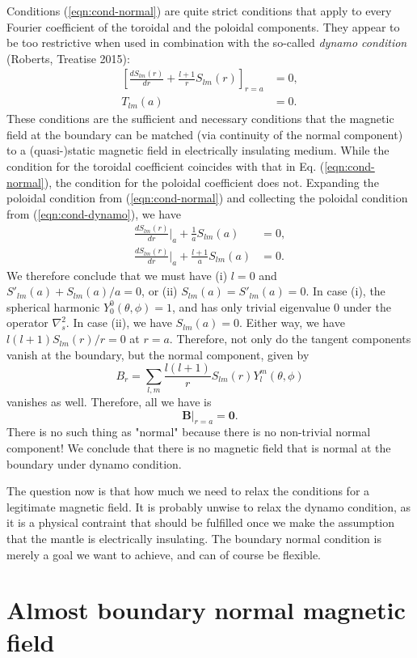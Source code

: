 \documentclass[a4paper, 11pt]{article}
\begin{document}
Conditions (\ref{eqn:cond-normal}) are quite strict conditions that apply to every Fourier coefficient of the toroidal and the poloidal components. They appear to be too restrictive when used in combination with the so-called \textit{dynamo condition} (Roberts, Treatise 2015):
\begin{equation}\label{eqn:cond-dynamo}
\begin{aligned}
    \left[\frac{dS_{lm}(r)}{dr} + \frac{l+1}{r} S_{lm}(r)\right]_{r=a} &= 0,\\
    T_{lm}(a) &= 0.
\end{aligned}
\end{equation}
These conditions are the sufficient and necessary conditions that the magnetic field at the boundary can be matched (via continuity of the normal component) to a (quasi-)static magnetic field in electrically insulating medium.
While the condition for the toroidal coefficient coincides with that in Eq. (\ref{eqn:cond-normal}), the condition for the poloidal coefficient does not. Expanding the poloidal condition from (\ref{eqn:cond-normal}) and collecting the poloidal condition from (\ref{eqn:cond-dynamo}), we have
\begin{equation}
    \begin{aligned}
        \frac{dS_{lm}(r)}{dr}\Big|_{a} + \frac{1}{a} S_{lm}(a) &= 0, \\
        \frac{dS_{lm}(r)}{dr}\Big|_{a} + \frac{l+1}{a} S_{lm}(a) &= 0.
    \end{aligned}
\end{equation}
We therefore conclude that we must have (i) $l=0$ and $S'_{lm}(a) + S_{lm}(a)/a = 0$, or (ii) $S_{lm}(a) = S'_{lm}(a) = 0$.
In case (i), the spherical harmonic $Y_{0}^0(\theta, \phi) = 1$, and has only trivial eigenvalue $0$ under the operator $\nabla_s^2$. In case (ii), we have $S_{lm}(a) = 0$. Either way, we have $l(l+1) S_{lm}(r)/r = 0$ at $r=a$. Therefore, not only do the tangent components vanish at the boundary, but the normal component, given by
\[
    B_r = \sum_{l,m} \frac{l(l+1)}{r} S_{lm}(r) Y_l^m(\theta, \phi)
\]
vanishes as well. Therefore, all we have is 
\begin{equation}
    \mathbf{B}|_{r=a} = \mathbf{0}.
\end{equation}
There is no such thing as "normal" because there is no non-trivial normal component! We conclude that there is no magnetic field that is normal at the boundary under dynamo condition.

The question now is that how much we need to relax the conditions for a legitimate magnetic field. It is probably unwise to relax the dynamo condition, as it is a physical contraint that should be fulfilled once we make the assumption that the mantle is electrically insulating. The boundary normal condition is merely a goal we want to achieve, and can of course be flexible.


\section{Almost boundary normal magnetic field}
\end{document}
